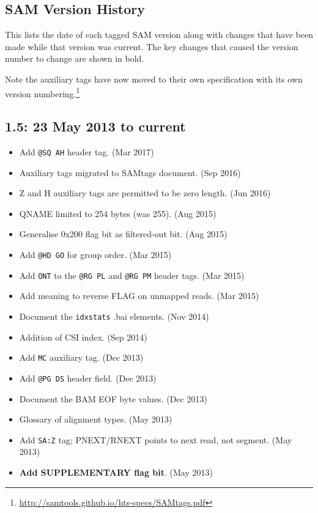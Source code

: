 \documentclass[10pt]{article}
\begin{document}
\begin{appendices}
\appendix
\section{SAM Version History}\label{sec:history}

This lists the date of each tagged SAM version along with changes that
have been made while that version was current.  The key changes
that caused the version number to change are shown in bold.

Note the auxiliary tags have now moved to their own
specification with its own version numbering.\footnote{
\href{http://samtools.github.io/hts-specs/SAMtags.pdf}{http://samtools.github.io/hts-specs/SAMtags.pdf}}

\subsection*{1.5: 23 May 2013 to current}

\begin{itemize}
\item Add {\tt @SQ AH} header tag. (Mar 2017)
\item Auxiliary tags migrated to SAMtags document. (Sep 2016)
\item Z and H auxiliary tags are permitted to be zero length. (Jun 2016)
\item QNAME limited to 254 bytes (was 255). (Aug 2015)
\item Generalise 0x200 flag bit as filtered-out bit. (Aug 2015)
\item Add {\tt @HD GO} for group order. (Mar 2015)
\item Add {\tt ONT} to the {\tt @RG PL} and {\tt @RG PM} header tags. (Mar 2015)
\item Add meaning to reverse FLAG on unmapped reads. (Mar 2015)
\item Document the {\tt idxstats} .bai elements. (Nov 2014)
\item Addition of CSI index. (Sep 2014)
\item Add {\tt MC} auxiliary tag. (Dec 2013)
\item Add {\tt @PG DS} header field. (Dec 2013)
\item Document the BAM EOF byte values. (Dec 2013)
\item Glossary of alignment types. (May 2013)
\item Add {\tt SA:Z} tag; PNEXT/RNEXT points to next read, not
  segment.  (May 2013)
\item \textbf{Add SUPPLEMENTARY flag bit}. (May 2013)
\end{itemize}


\end{appendices}
\end{document}
